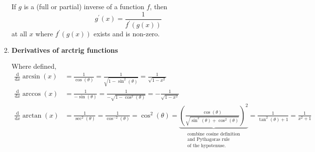 \begin{enumerate}
        If $g$ is a (full or partial) inverse of a function $f$, then
        $$
        g^\prime(x)=\frac{1}{f^\prime(g(x))}
        $$
        at all $x$ where $f^\prime(g(x))$ exists and is non-zero.
    \item \textbf{Derivatives of arctrig functions}

        Where defined,
        \begin{align*}
            \frac{\mathrm{d}}{\mathrm{d}x}\arcsin(x) & =\frac{1}{\cos(\theta)}=\frac{1}{\sqrt{1-\sin^2(\theta)}}=\frac{1}{\sqrt{1-x^2}} \\
            \frac{\mathrm{d}}{\mathrm{d}x}\arccos(x) & =\frac{1}{-\sin(\theta)}=\frac{1}{-\sqrt{1-\cos^2(\theta)}}=-\frac{1}{\sqrt{1-x^2}} \\
            \frac{\mathrm{d}}{\mathrm{d}x}\arctan(x) & =\frac{1}{\sec^2(\theta)}=\frac{1}{\cos^{-2}(\theta)}=\cos^2(\theta)=\underbrace{\left(\frac{\cos(\theta)}{\sqrt{\sin^2(\theta)+\cos^2(\theta)}}\right)^2}_{\substack{\text{combine cosine definition} \\ \text{and Pythagoras rule} \\ \text{of the hypotenuse.}}}=\frac{1}{\tan^2(\theta)+1}=\frac{1}{x^2+1}
        \end{align*}
\end{enumerate}

